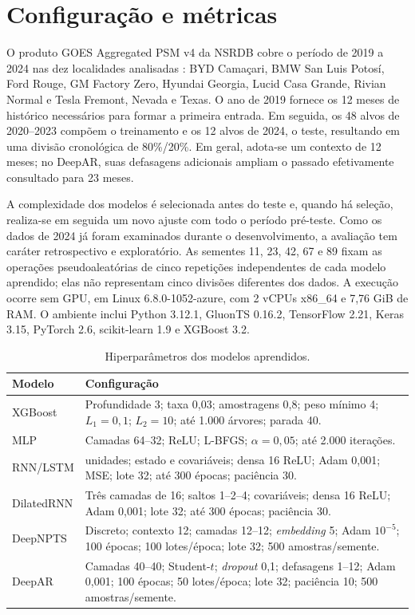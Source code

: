 \documentclass[12pt,a4paper,fleqn]{article}
\begin{document}
\section{Configuração e métricas}
\label{sec:configuracao}

O produto GOES Aggregated PSM v4 da NSRDB cobre o período de 2019 a 2024 nas dez localidades analisadas \citep{nlr2026}: BYD Camaçari, BMW San Luis Potosí, Ford Rouge, GM Factory Zero, Hyundai Georgia, Lucid Casa Grande, Rivian Normal e Tesla Fremont, Nevada e Texas. O ano de 2019 fornece os 12 meses de histórico necessários para formar a primeira entrada. Em seguida, os 48 alvos de 2020--2023 compõem o treinamento e os 12 alvos de 2024, o teste, resultando em uma divisão cronológica de 80\%/20\%. Em geral, adota-se um contexto de 12 meses; no DeepAR, suas defasagens adicionais ampliam o passado efetivamente consultado para 23 meses.

A complexidade dos modelos é selecionada antes do teste e, quando há seleção, realiza-se em seguida um novo ajuste com todo o período pré-teste. Como os dados de 2024 já foram examinados durante o desenvolvimento, a avaliação tem caráter retrospectivo e exploratório. As sementes 11, 23, 42, 67 e 89 fixam as operações pseudoaleatórias de cinco repetições independentes de cada modelo aprendido; elas não representam cinco divisões diferentes dos dados. A execução ocorre sem GPU, em Linux 6.8.0-1052-azure, com 2 vCPUs x86\_64 e 7,76 GiB de RAM. O ambiente inclui Python 3.12.1, GluonTS 0.16.2, TensorFlow 2.21, Keras 3.15, PyTorch 2.6, scikit-learn 1.9 e XGBoost 3.2.

\begin{table}[!ht]
\centering
\caption{Hiperparâmetros dos modelos aprendidos.}
\label{tab:hiper}
\renewcommand{\arraystretch}{1.02}
\setlength{\tabcolsep}{3pt}
\begin{tabular}{>{\raggedright\arraybackslash}p{2.2cm}>{\raggedright\arraybackslash}p{12.1cm}}
\toprule
\textbf{Modelo} & \textbf{Configuração} \\
\midrule
XGBoost & Profundidade 3; taxa 0,03; amostragens 0,8; peso mínimo 4; $L_1=0,1$; $L_2=10$; até 1.000 árvores; parada 40. \\
MLP & Camadas 64--32; ReLU; L-BFGS; $\alpha=0,05$; até 2.000 iterações. \\
RNN/LSTM & 16 unidades; estado e covariáveis; densa 16 ReLU; Adam 0,001; MSE; lote 32; até 300 épocas; paciência 30. \\
DilatedRNN & Três camadas de 16; saltos 1--2--4; covariáveis; densa 16 ReLU; Adam 0,001; lote 32; até 300 épocas; paciência 30. \\
DeepNPTS & Discreto; contexto 12; camadas 12--12; \textit{embedding} 5; Adam $10^{-5}$; 100 épocas; 100 lotes/época; lote 32; 500 amostras/semente. \\
DeepAR & Camadas 40--40; Student-$t$; \textit{dropout} 0,1; defasagens 1--12; Adam 0,001; 100 épocas; 50 lotes/época; lote 32; paciência 10; 500 amostras/semente. \\
\bottomrule
\end{tabular}
\end{table}
\end{document}
